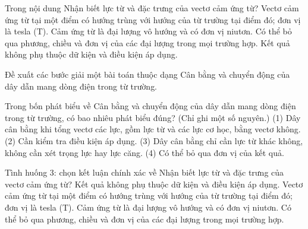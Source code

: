\begin{ex}
Trong nội dung Nhận biết lực từ và đặc trưng của vectơ cảm ứng từ?
\choice
{\True Vectơ cảm ứng từ tại một điểm có hướng trùng với hướng của từ trường tại điểm đó; đơn vị là tesla (T).}
{Cảm ứng từ là đại lượng vô hướng và có đơn vị niutơn.}
{Có thể bỏ qua phương, chiều và đơn vị của các đại lượng trong mọi trường hợp.}
{Kết quả không phụ thuộc dữ kiện và điều kiện áp dụng.}
\end{ex}

\begin{bt}
Đề xuất các bước giải một bài toán thuộc dạng Cân bằng và chuyển động của dây dẫn mang dòng điện trong từ trường.
\end{bt}

\begin{ex}
Trong bốn phát biểu về Cân bằng và chuyển động của dây dẫn mang dòng điện trong từ trường, có bao nhiêu phát biểu đúng? (Chỉ ghi một số nguyên.) (1) Dây cân bằng khi tổng vectơ các lực, gồm lực từ và các lực cơ học, bằng vectơ không. (2) Cần kiểm tra điều kiện áp dụng. (3) Dây cân bằng chỉ cần lực từ khác không, không cần xét trọng lực hay lực căng. (4) Có thể bỏ qua đơn vị của kết quả.
\end{ex}

\begin{ex}
Tình huống 3: chọn kết luận chính xác về Nhận biết lực từ và đặc trưng của vectơ cảm ứng từ?
\choice
{Kết quả không phụ thuộc dữ kiện và điều kiện áp dụng.}
{\True Vectơ cảm ứng từ tại một điểm có hướng trùng với hướng của từ trường tại điểm đó; đơn vị là tesla (T).}
{Cảm ứng từ là đại lượng vô hướng và có đơn vị niutơn.}
{Có thể bỏ qua phương, chiều và đơn vị của các đại lượng trong mọi trường hợp.}
\end{ex}

